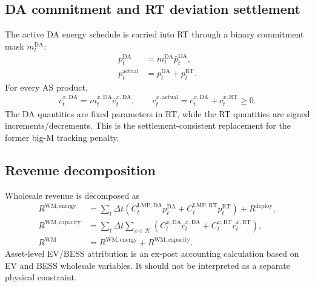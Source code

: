 \documentclass[final,5p,times]{elsarticle}
\newcommand{\DeltaT}{\Delta t}
\newcommand{\DA}{\mathrm{DA}}
\newcommand{\RT}{\mathrm{RT}}
\newcommand{\WM}{\mathrm{WM}}
\newcommand{\energy}{\mathrm{energy}}
\newcommand{\capacity}{\mathrm{capacity}}
\newcommand{\calK}{\mathcal{K}}
\begin{document}
\subsection{DA commitment and RT deviation settlement}
The active DA energy schedule is carried into RT through a binary commitment mask $m_t^{\DA}$:
\begin{align}
p_t^{\DA}&=m_t^{\DA}\bar p_t^{\DA},\label{eq:app_da_commitment}\\
p_t^{\mathrm{actual}}&=p_t^{\DA}+p_t^{\RT}.\label{eq:app_rt_deviation}
\end{align}
For every AS product,
\begin{align}
c_t^{x,\DA}=m_t^{x,\DA}\bar c_t^{x,\DA},\qquad
c_t^{x,\mathrm{actual}}=c_t^{x,\DA}+c_t^{x,\RT}\ge0.
\label{eq:app_as_commitment}
\end{align}
The DA quantities are fixed parameters in RT, while the RT quantities are signed increments/decrements. This is the settlement-consistent replacement for the former big-M tracking penalty.

\subsection{Revenue decomposition}
Wholesale revenue is decomposed as
\begin{align}
R^{\WM,\energy}&=\sum_t\DeltaT\left(C_t^{\mathrm{LMP},\DA}p_t^{\DA}+C_t^{\mathrm{LMP},\RT}p_t^{\RT}\right)+R^{\mathrm{deploy}},\label{eq:app_energy_rev}\\
R^{\WM,\capacity}&=\sum_t\DeltaT\sum_{x\in\calK}\left(C_t^{x,\DA}c_t^{x,\DA}+C_t^{x,\RT}c_t^{x,\RT}\right),\label{eq:app_capacity_rev}\\
R^{\WM}&=R^{\WM,\energy}+R^{\WM,\capacity}.\label{eq:app_total_rev}
\end{align}
Asset-level EV/BESS attribution is an ex-post accounting calculation based on EV and BESS wholesale variables. It should not be interpreted as a separate physical constraint.






\end{document}
